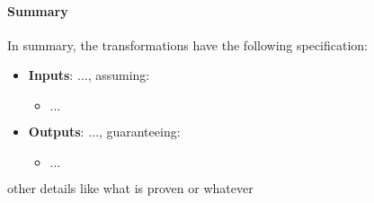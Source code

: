 \paragraph{Summary}
In summary, the transformations have the following specification:

\begin{itemize}
\item \textbf{Inputs}: $\ldots$, assuming:
\begin{itemize}
\item $\ldots$
\end{itemize}
\item \textbf{Outputs}: $\ldots$, guaranteeing:
\begin{itemize}
\item $\ldots$
\end{itemize}
\end{itemize}

other details like what is proven or whatever

\iffalse
\paragraph{Input: Patch Candidates}
They come from differencing.

\paragraph{Output: Reusable Proof Patch}
The corresponding proof term transformations then try to transform each of those candidate patch functions to a more general \textit{reusable proof patch}:
a function that can be applied with traditional proof automation to fix other proofs broken by the same change.
\fi

